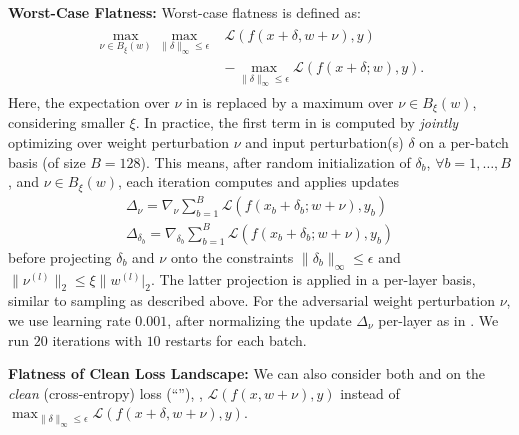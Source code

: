 \textbf{Worst-Case Flatness:}
%
Worst-case flatness is defined as:
\begin{align}
	\begin{split}
		\max_{\nu \in B_\xi(w)} \max\limits_{\|\delta\|_\infty \leq \epsilon} &\mathcal{L}(f(x{+}\delta, w{+}\nu), y)\\
		&- \max\limits_{\|\delta\|_\infty \leq \epsilon} \mathcal{L}(f(x{+}\delta;w), y).
	\end{split}\label{eq:supp-worst}
\end{align}
Here, the expectation over $\nu$ in  is replaced by a maximum over $\nu \in B_\xi(w)$, considering smaller $\xi$. In practice, the first term in  is computed by \emph{jointly} optimizing over weight perturbation $\nu$ and input perturbation(s) $\delta$ on a per-batch basis (of size $B = 128$). This means, after random initialization of $\delta_b$, $\forall b = 1,\ldots,B$, and $\nu \in B_\xi(w)$, each iteration computes and applies updates
\begin{align}
	\Delta_\nu = \nabla_\nu \sum_{b = 1}^B\mathcal{L}(f(x_b + \delta_b; w + \nu), y_b)\\
	\Delta_{\delta_b} = \nabla_{\delta_b} \sum_{b = 1}^B\mathcal{L}(f(x_b + \delta_b; w + \nu), y_b)
\end{align}
before projecting $\delta_b$ and $\nu$ onto the constraints $\|\delta_b\|_\infty \leq \epsilon$ and $\|\nu^{(l)}\|_2 \leq \xi \|w^{(l)}|_2$. The latter projection is applied in a per-layer basis, similar to sampling as described above. For the adversarial weight perturbation $\nu$, we use learning rate $0.001$, after normalizing the update $\Delta_\nu$ per-layer as in . We run $20$ iterations with $10$ restarts for each batch.

\textbf{Flatness of Clean Loss Landscape:}
%
We can also consider both  and  on the \emph{clean} (cross-entropy) loss (``\CE''), \ie, $\mathcal{L}(f(x, w{+}\nu), y)$ instead of $\max_{\|\delta\|_\infty \leq \epsilon} \mathcal{L}(f(x{+}\delta, w{+}\nu), y)$. 

